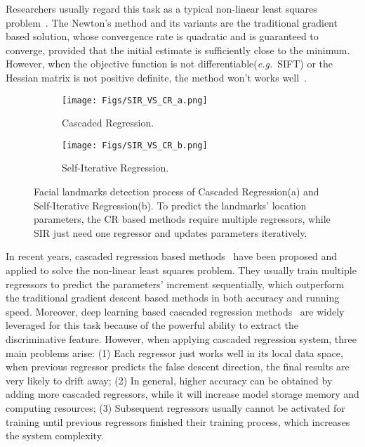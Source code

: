 \documentclass[letterpaper]{article} \usepackage{aaai18}  \usepackage{times}  \usepackage{helvet}  \usepackage{courier}  \usepackage{url}  \usepackage{graphicx}
\def\eg{{\em e.g.}}
\begin{document}
Researchers usually regard this task as a typical non-linear least squares problem~\cite{Xiong:SDM:CVPR2013}. The Newton's method and its variants are the traditional gradient based solution, whose convergence rate is quadratic and is guaranteed to converge, provided that the initial estimate is sufficiently close to the minimum. However, when the objective function is not differentiable(\eg~SIFT\cite{SIFT:ijcv:Lowe04}) or the Hessian matrix is not positive definite, the method won't works well~\cite{Xiong:SDM:CVPR2013,Xiong:GSDM:CVPR2015}.
\begin{figure}[t]
\begin{subfigure}{.25\textwidth}
  \centering
  \texttt{[image: Figs/SIR\_VS\_CR\_a.png]}
  \caption{Cascaded Regression.}
  \label{fig:sfig1}
\end{subfigure}\begin{subfigure}{.25\textwidth}
  \centering
  \texttt{[image: Figs/SIR\_VS\_CR\_b.png]}
  \caption{Self-Iterative Regression.}
  \label{fig:sfig2}
\end{subfigure}
\caption{Facial landmarks detection process of Cascaded Regression(a) and Self-Iterative Regression(b). To predict the landmarks' location parameters, the CR based methods require multiple regressors, while SIR just need one regressor and updates parameters iteratively.}
\label{fig:SIR_VS_CR}
\end{figure}

In recent years, cascaded regression based methods~\cite{Dollar:CPR:CVPR2010,Cao:ESR:CVPR2012,Xiong:SDM:CVPR2013,ShaoqinRen:LBF:CVPR2014,Xiangyu:3DDFA:CVPR2016,FengLiu:JFAFR:ECCV2016,Tzimiropoulos:PO-CR:CVP2015,Zhuowen:cvpr08} have been proposed and applied to solve the non-linear least squares problem. They usually train multiple regressors to predict the parameters' increment sequentially, which outperform the traditional gradient descent based methods in both accuracy and running speed. Moreover, deep learning based cascaded regression methods~\cite{SunWT:cascaded-cnn:cvpr13,Zhang:MTL:ECCV2014,Trigeorgis:MDM:CVPR16,XiaoFXLYK:RAR:ECCV2016,eccv14:ZhangSKC:CFAN} are widely leveraged for this task because of the powerful ability to extract the discriminative feature. However, when applying cascaded regression system, three main problems arise: (1) Each regressor just works well in its local data space, when previous regressor predicts the false descent direction, the final results are very likely to drift away; (2) In general, higher accuracy can be obtained by adding more cascaded regressors, while it will increase model storage memory and computing resources; (3) Subsequent regressors usually cannot be activated for training until previous regressors finished their training process, which increases the system complexity.
\end{document}
